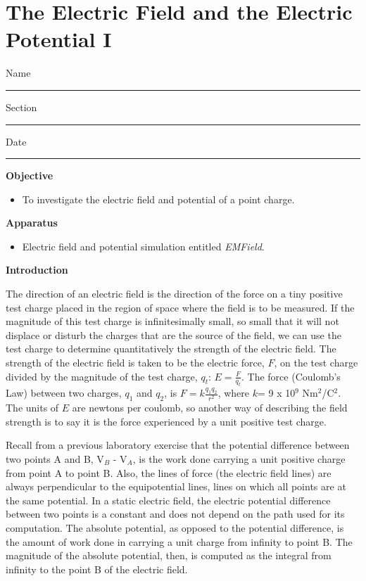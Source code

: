 
\section{The Electric Field and the Electric Potential I}

Name \rule{2.0in}{0.1pt}\hfill{}Section \rule{1.0in}{0.1pt}\hfill{}Date
\rule{1.0in}{0.1pt}

\textbf{Objective}

\begin{itemize}
\item To investigate the electric field and potential of a point charge.
\end{itemize}

\textbf{Apparatus}

\begin{itemize}
\item Electric field and potential simulation entitled {\it EMField}.
\end{itemize}

\textbf{Introduction}

The direction of an electric field is the direction of the force on
a tiny positive test charge placed in the region of space where the
field is to be measured. If the magnitude of this test charge is infinitesimally
small, so small that it will not displace or disturb the charges that
are the source of the field, we can use the test charge to determine
quantitatively the strength of the electric field. The strength of
the electric field is taken to be the electric force, $F$, on the test
charge divided by the magnitude of the test charge, \( q_{t} \):
\( E=\frac{F}{q_{t}} \). The force (Coulomb's Law) between two charges,
\( q_{1} \) and \( q_{2} \), is \( F=k\frac{q_{1}q_{2}}{r^{2}} \),
where \( k \)= 9 x 10\( ^{9} \) Nm\( ^{2} \)/C\( ^{2} \). The units
of \( E \) are newtons per coulomb, so another way of describing the field
strength is to say it is the force experienced by a unit positive
test charge.

Recall from a previous laboratory exercise that the potential difference
between two points A and B, V\( _{B} \) - V\( _{A} \), is the work
done carrying a unit positive charge from point A to point B. Also,
the lines of force (the electric field lines) are always perpendicular
to the equipotential lines, lines on which all points are at the same
potential. In a static electric field, the electric potential difference
between two points is a constant and does not depend on the path used
for its computation. The absolute potential, as opposed to the potential
difference, is the amount of work done in carrying a unit charge from
infinity to point B. The magnitude of the absolute potential, then,
is computed as the integral from infinity to the point B of the electric
field.


